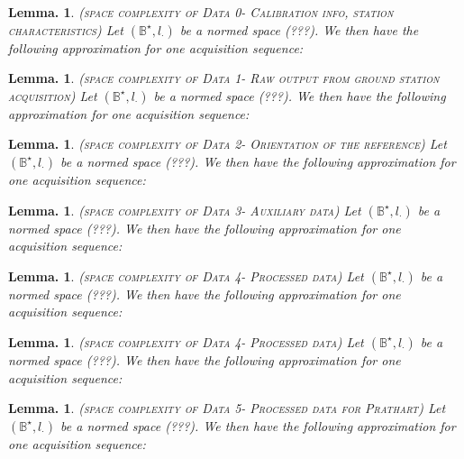 \documentclass[a4paper]{report}
\newtheorem{proposition}[theorem]{Lemma.}
\begin{document}
\begin{proposition}
  (\textsc{space complexity of Data 0- Calibration info, station characteristics})
  Let $(\mathbb{B}^{\star}, l_{\cdot})$ be a normed space (???). We then have the following approximation for one acquisition sequence:
\end{proposition}

\begin{proposition}
  (\textsc{space complexity of Data 1- Raw output from ground station acquisition})
  Let $(\mathbb{B}^{\star}, l_{\cdot})$ be a normed space (???). We then have the following approximation for one acquisition sequence:
\end{proposition}

\begin{proposition}
  (\textsc{space complexity of Data 2- Orientation of the reference})
  Let $(\mathbb{B}^{\star}, l_{\cdot})$ be a normed space (???). We then have the following approximation for one acquisition sequence:
\end{proposition}

\begin{proposition}
  (\textsc{space complexity of Data 3- Auxiliary data})
  Let $(\mathbb{B}^{\star}, l_{\cdot})$ be a normed space (???). We then have the following approximation for one acquisition sequence:
\end{proposition}

\begin{proposition}
  (\textsc{space complexity of Data 4- Processed data})
  Let $(\mathbb{B}^{\star}, l_{\cdot})$ be a normed space (???). We then have the following approximation for one acquisition sequence:
\end{proposition}

\begin{proposition}
  (\textsc{space complexity of Data 4- Processed data})
  Let $(\mathbb{B}^{\star}, l_{\cdot})$ be a normed space (???). We then have the following approximation for one acquisition sequence:
\end{proposition}

\begin{proposition}
  (\textsc{space complexity of Data 5- Processed data for Prathart})
  Let $(\mathbb{B}^{\star}, l_{\cdot})$ be a normed space (???). We then have the following approximation for one acquisition sequence:
\end{proposition}
\end{document}

